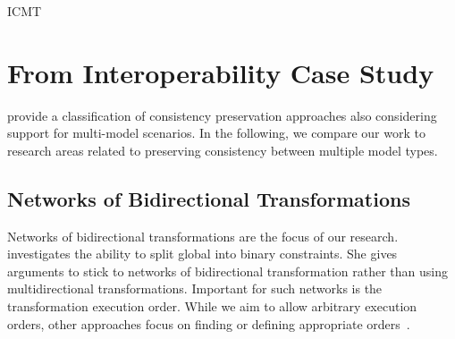 \begin{copiedFrom}{ICMT}

\section*{From Interoperability Case Study}

\textcite{macedo2017ModelRepairClassification-TSE} provide a classification of consistency preservation approaches also considering support for multi-model scenarios. %
In the following, we compare our work to research areas related to preserving consistency between multiple model types.

\subsection*{Networks of Bidirectional Transformations} 
Networks of bidirectional transformations are the focus of our research.
\textcite{stevens2020BidirectionalTransformationLarge-SoSym} investigates the ability to split global into binary constraints.
She gives arguments to stick to networks of bidirectional transformation rather than using multidirectional transformations. %
Important for such networks is the transformation execution order. 
While we aim to allow arbitrary execution orders, other approaches focus on finding or defining appropriate orders~\cite{stevens2020BuildingFromMegamodels-SoSym}.



\end{copiedFrom}
